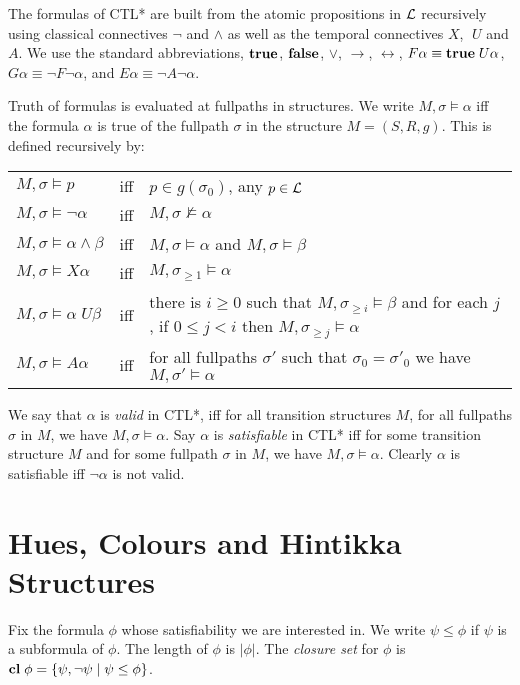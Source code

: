 \documentclass[submission,copyright,creativecommons]{eptcs}
\newcommand{\truth}{\mbox{{\bf true}}}
\newcommand{\falsity}{\mbox{{\bf false}}}
\newcommand{\unt}{\;{U}}
\newcommand{\tom}{{X}}
\newcommand{\fut}{F}
\newcommand{\alw}{G}
\newcommand{\pos}{{E}}
\newcommand{\nec}{{A}}
\newcommand{\clos}{\mbox{{\bf cl}}\;}
\newcommand{\vb}{\; | \;}
\begin{document}
The formulas of CTL* are built from the
atomic propositions in $\cal L$ recursively
using classical connectives $\neg$ and $\wedge$ as
well as the temporal connectives
$\tom$, $\unt$ and $\nec$.
We use the standard abbreviations, $\truth$, 
$\falsity$, $\vee$,
$\rightarrow$,  $\leftrightarrow$, 
$\fut \alpha \equiv \truth \unt \alpha$,
$\alw \alpha \equiv \neg \fut \neg \alpha$, 
and $\pos \alpha \equiv \neg \nec
\neg \alpha$.

Truth of formulas is evaluated at fullpaths
in structures.
We write $M, \sigma \models \alpha$ iff the
formula $\alpha$ is true of the fullpath $\sigma$
in the structure $M=(S,R,g)$.
This is defined recursively by:\\
\begin{tabular}{lll}
$M, \sigma \models p$ & iff & $p \in g(\sigma_0)$, any $p \in {\cal L}$\\
$M, \sigma \models \neg \alpha$ & iff &
$M, \sigma \not \models \alpha$\\
$M, \sigma \models \alpha \wedge \beta$ & iff &
$M, \sigma \models \alpha$ and 
$M, \sigma \models \beta$\\
$M, \sigma \models \tom \alpha$ & iff &
$M, \sigma_{\geq 1} \models \alpha$\\
$M, \sigma \models \alpha \unt \beta$ & iff &   
there is $i \geq 0$ such that
$M, \sigma_{\geq i} \models \beta$ and
for each $j$, if $0 \leq j < i$ then
$M, \sigma_{\geq j}  \models \alpha$\\ 
$M, \sigma \models \nec \alpha$ & iff &
for all fullpaths $\sigma'$ such that
$\sigma_0 = \sigma'_0$ we have
$M, \sigma' \models \alpha$\\
\end{tabular}



We say that $\alpha$ is {\em valid} in CTL*, iff
for all transition structures $M$, for all fullpaths $\sigma$ in $M$,
we have
$M,\sigma \models \alpha$.
Say $\alpha$ is {\em satisfiable} in CTL* iff
for some transition structure $M$ and for some fullpath $\sigma$ in $M$,
we have
$M,\sigma \models \alpha$.
Clearly $\alpha$ is satisfiable
iff $\neg \alpha$ is not valid.


\section{Hues, Colours and Hintikka Structures}
\label{sec:huecol}

Fix the formula $\phi$ whose
satisfiability we are interested in.
We write
$\psi \leq \phi$
if $\psi$ is a subformula
of $\phi$.
The length of $\phi$ is $|\phi|$.
The {\em closure set} for $\phi$ is $\clos \phi =
\{ \psi, \neg \psi \vb
\psi \leq \phi \}$.
\end{document}

